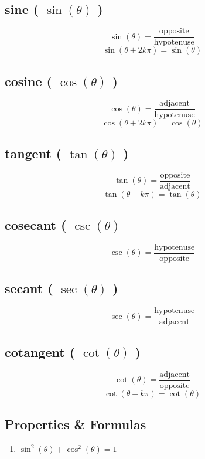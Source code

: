 \subsection{sine ( $\sin(\theta)$ )}\label{sine (sin)}

\[
    \sin(\theta) = \displaystyle \dfrac{\mathrm{opposite}}{\mathrm{hypotenuse}}
\]
\[    \sin(\theta + 2k\pi) = \sin(\theta)   \]

\subsection{cosine ( $\cos(\theta)$ )}\label{cosine (cos)}

\[
    \cos(\theta) = \displaystyle\dfrac{\mathrm {adjacent} }{\mathrm {hypotenuse} }
\]
\[  \cos(\theta + 2k\pi ) = \cos(\theta)  \]

\subsection{tangent ( $\tan(\theta)$ )}\label{tangent (tan)}

\[
    \tan(\theta) =\displaystyle \frac {\mathrm {opposite} }{\mathrm {adjacent} }
\]
\[  \tan(\theta + k\pi ) = \tan(\theta)  \]

\subsection{cosecant ( $\csc(\theta)$ }\label{cosecant (csc)}
\[
    \csc(\theta) =\displaystyle\frac {\mathrm {hypotenuse} }{\mathrm {opposite} }
\]

\subsection{secant ( $\sec(\theta)$ )}\label{secant (sec)}
\[
    \sec(\theta) =\displaystyle\frac {\mathrm {hypotenuse} }{\mathrm {adjacent} }
\]

\subsection{cotangent ( $\cot(\theta)$ )}\label{cotangent (cot)}

\[
    \cot(\theta) =\displaystyle\frac {\mathrm {adjacent} }{\mathrm {opposite} }
\]
\[  \cot(\theta + k\pi ) = \cot(\theta)  \]


\subsection{Properties \& Formulas}
\begin{enumerate}
    \item \( \sin^2(\theta) + \cos^2(\theta) = 1 \)
\end{enumerate}


